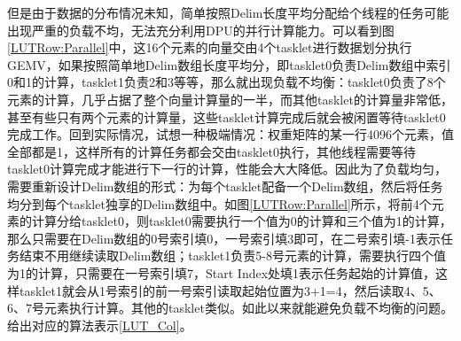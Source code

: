但是由于数据的分布情况未知，简单按照Delim长度平均分配给个线程的任务可能出现严重的负载不均，无法充分利用DPU的并行计算能力。可以看到图\ref{LUTRow:Parallel}中，这16个元素的向量交由4个tasklet进行数据划分执行GEMV，如果按照简单地Delim数组长度平均分，即tasklet0负责Delim数组中索引0和1的计算，tasklet1负责2和3等等，那么就出现负载不均衡：tasklet0负责了8个元素的计算，几乎占据了整个向量计算量的一半，而其他tasklet的计算量非常低，甚至有些只有两个元素的计算量，这些tasklet计算完成后就会被闲置等待tasklet0完成工作。回到实际情况，试想一种极端情况：权重矩阵的某一行4096个元素，值全部都是1，这样所有的计算任务都会交由tasklet0执行，其他线程需要等待tasklet0计算完成才能进行下一行的计算，性能会大大降低。因此为了负载均匀，需要重新设计Delim数组的形式：为每个tasklet配备一个Delim数组，然后将任务均分到每个tasklet独享的Delim数组中。如图\ref{LUTRow:Parallel}所示，将前4个元素的计算分给tasklet0，则tasklet0需要执行一个值为0的计算和三个值为1的计算，那么只需要在Delim数组的0号索引填0，一号索引填3即可，在二号索引填-1表示任务结束不用继续读取Delim数组；tasklet1负责5-8号元素的计算，需要执行四个值为1的计算，只需要在一号索引填7，Start Index处填1表示任务起始的计算值，这样tasklet1就会从1号索引的前一号索引读取起始位置为3+1=4，然后读取4、5、6、7号元素执行计算。其他的tasklet类似。如此以来就能避免负载不均衡的问题。给出对应的算法表示\ref{LUT_Col}。

